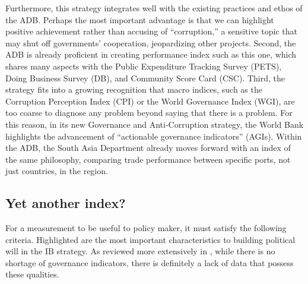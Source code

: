 \documentclass[12pt]{article}
\begin{document}
Furthermore, this strategy integrates well with the existing practices and ethos of the ADB. Perhaps the most important advantage is that we can highlight positive achievement rather than accusing of ``corruption,'' a sensitive topic that may shut off governments' cooperation, jeopardizing other projects. Second, the ADB is already proficient in creating performance index such as this one, which shares many aspects with the Public Expenditure Tracking Survey (PETS), Doing Business Survey (DB), and Community Score Card (CSC). Third, the strategy fits into a growing recognition that macro indices, such as the Corruption Perception Index (CPI) or the World Governance Index (WGI), are too coarse to diagnose any problem beyond saying that there is a problem. For this reason, in its new Governance and Anti-Corruption strategy, the World Bank highlights the advancement of ``actionable governance indicators'' (AGIs). Within the ADB, the South Asia Department already moves forward with an index of the same philosophy, comparing trade performance between specific ports, not just countries, in the region.

\subsection{Yet another index?} \label{sec:anotherindex}
For a measurement to be useful to policy maker, it must satisfy the following criteria. Highlighted are the most important characteristics to building political will in the IB strategy. As reviewed more extensively in \citet{Pande2013}, while there is no shortage of governance indicators, there is definitely a lack of data that possess these qualities.
\end{document}
